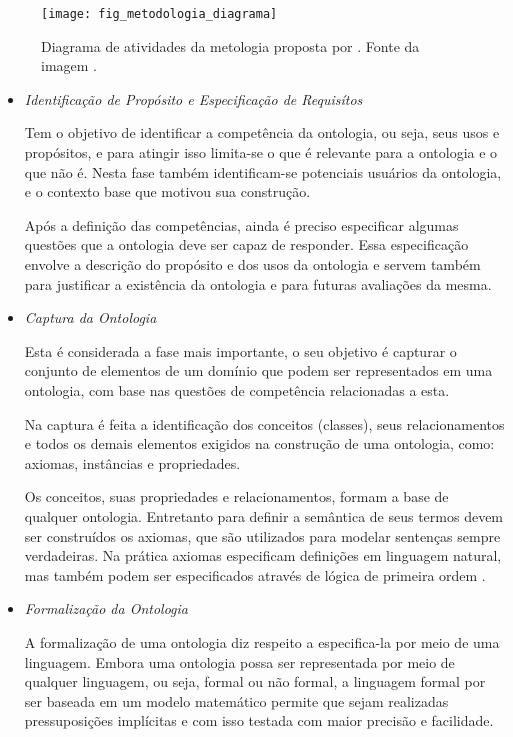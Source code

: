 \begin{figure}[!h]
  \centering
  \texttt{[image: fig\_metodologia\_diagrama]} 
  \caption{Diagrama de atividades da metologia proposta por 
    \cite{guizzardidesenvolvimento}. Fonte da imagem \cite{morais2007ontologias}. 
  }
  \label{fig:diagrama_metodologia} 
\end{figure}

\begin{itemize}
    \item \textit{Identificação de Propósito e Especificação de Requisítos}
    
    Tem o objetivo de identificar a competência da ontologia, ou seja, seus usos
    e propósitos, e para atingir isso limita-se o que é relevante para a ontologia
    e o que não é. Nesta fase também identificam-se potenciais usuários da ontologia,
    e o contexto base que motivou sua construção.
    
    Após a definição das competências, ainda é preciso especificar algumas 
    questões que a ontologia deve ser capaz de responder. Essa especificação 
    envolve a descrição do propósito e dos usos da ontologia e servem também para
    justificar a existência da ontologia e para futuras avaliações da mesma.
    
    \item \textit{Captura da Ontologia}
    
    Esta é considerada a fase mais importante, o seu objetivo é capturar o 
    conjunto de elementos de um domínio que podem ser representados em uma 
    ontologia, com base nas questões de competência relacionadas a esta.
    
    Na captura é feita a identificação dos conceitos (classes), seus 
    relacionamentos e todos os demais elementos exigidos na construção de uma
    ontologia, como: axiomas, instâncias e propriedades.
    
    Os conceitos, suas propriedades e relacionamentos, formam a base de qualquer
    ontologia. Entretanto para definir a semântica de seus termos devem ser 
    construídos os axiomas, que são utilizados para modelar sentenças sempre
    verdadeiras. Na prática axiomas especificam definições em linguagem natural,
    mas também podem ser especificados através de lógica de primeira ordem 
    \cite{falbo1998integracao}.
    
    \item \textit{Formalização da Ontologia}
    
    A formalização de uma ontologia diz respeito a especifica-la por meio de uma
    linguagem. Embora uma ontologia possa ser representada por meio de qualquer 
    linguagem, ou seja, formal ou não formal, a linguagem formal por ser baseada
    em um modelo matemático permite que sejam realizadas pressuposições 
    implícitas e com isso testada com maior precisão e facilidade.
    

\end{itemize}
